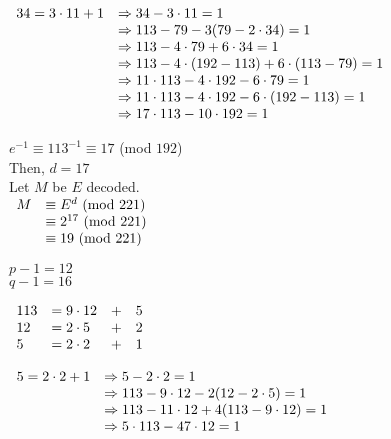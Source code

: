 \documentclass[a4paper, 11pt]{article}
\begin{document}
\begin{myEnumerate}
\begin{myEnumerate}
        \(
        \begin{array}{ll}
        	34 = 3 \cdot 11 + 1 & \Rightarrow 34 - 3 \cdot 11 = 1 \\
            					& \Rightarrow 113 - 79 - 3(79 - 2 \cdot 34) = 1 \\
                                & \Rightarrow 113 - 4 \cdot 79 + 6 \cdot 34 = 1 \\
								& \Rightarrow 113 - 4 \cdot (192 - 113) + 6 \cdot (113 - 79) = 1 \\
								& \Rightarrow 11 \cdot 113 - 4 \cdot 192 - 6 \cdot 79 = 1 \\
								& \Rightarrow 11 \cdot 113 - 4 \cdot 192 - 6 \cdot (192 - 113) = 1 \\
                                & \Rightarrow 17 \cdot 113 - 10 \cdot 192 = 1
        \end{array} \\ \)
        
        $e^{-1} \equiv 113^{-1} \equiv 17$ (mod $192$) \\
        
        Then, $d = 17$ \\
        
        Let $M$ be $E$ decoded. \\
        
        \(
        \begin{array}{ll}
        	M & \equiv E^{d} $ $ ($mod $ 221) \\
              & \equiv 2^{17} $ $ ($mod $ 221) \\
              & \equiv 19 $ $ ($mod $ 221) \\
        \end{array} \\ \)
        
        \item
        $p - 1 = 12$ \\
        $q - 1 = 16$
        
        \( \\
        \begin{array}{llll}
        	113 & = 9 \cdot 12 & + & 5 \\
            12 & = 2 \cdot 5 & + & 2 \\
            5 & = 2 \cdot 2 & + & 1 \\
        \end{array} \\ \)
        
        \(
        \begin{array}{ll}
        	5 = 2 \cdot 2 + 1 & \Rightarrow 5 - 2 \cdot 2 = 1 \\
            				  & \Rightarrow 113 - 9 \cdot 12 - 2(12 - 2 \cdot 5) = 1 \\
                              & \Rightarrow 113 - 11 \cdot 12 + 4(113 - 9 \cdot 12) = 1 \\
							  & \Rightarrow 5 \cdot 113 - 47 \cdot 12 = 1 \\
        \end{array} \\ \)
        

\end{myEnumerate}
\end{myEnumerate}
\end{document}
